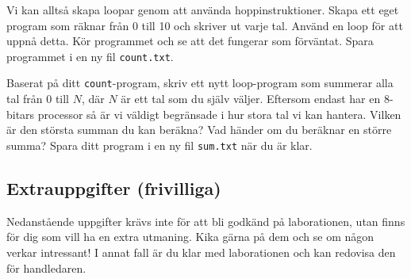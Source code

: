 \begin{Datorarbete}
    \item {} Vi kan alltså skapa loopar genom att använda hoppinstruktioner. Skapa ett eget program som räknar från 0 till 10 och skriver ut varje tal. Använd en loop för att uppnå detta. Kör programmet och se att det fungerar som förväntat. Spara programmet i en ny fil \texttt{count.txt}.
    
    \item {} Baserat på ditt \texttt{count}-program, skriv ett nytt loop-program som summerar alla tal från 0 till \(N\), där \(N\) är ett tal som du själv väljer. Eftersom \progname{} endast har en 8-bitars processor så är vi väldigt begränsade i hur stora tal vi kan hantera. Vilken är den största summan du kan beräkna? Vad händer om du beräknar en större summa? Spara ditt program i en ny fil \texttt{sum.txt} när du är klar.
\end{Datorarbete}


\subsection{Extrauppgifter (frivilliga)}

Nedanstående uppgifter krävs inte för att bli godkänd på laborationen, utan finns för dig som vill ha en extra utmaning. Kika gärna på dem och se om någon verkar intressant! I annat fall är du klar med laborationen och kan redovisa den för handledaren.


